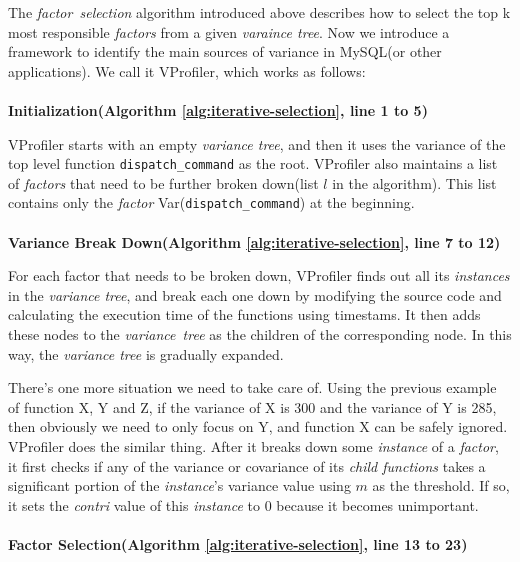 The \textit{factor\ selection} algorithm introduced above describes how to
select the top k most responsible \textit{factors} from a given
\textit{varaince tree}. Now we introduce a framework to identify the main
sources of variance in MySQL(or other applications). We call it VProfiler,
which works as follows:\\\\
\textbf{Initialization(Algorithm \ref{alg:iterative-selection}, line 1 to 5)}

VProfiler starts with an empty \textit{variance tree}, and then it uses the
variance of the top level function \texttt{dispatch\_command} as the root.
VProfiler also maintains a list of \textit{factors} that need to be further
broken down(list $l$ in the algorithm). This list contains only the
\textit{factor} Var(\texttt{dispatch\_command}) at the beginning.\\\\
\textbf{Variance Break Down(Algorithm \ref{alg:iterative-selection}, line 7 to
12)}

For each factor that needs to be broken down, VProfiler finds out all its
\textit{instances} in the \textit{variance tree}, and break each one down by
modifying the source code and calculating the execution time of the functions
using timestams. It then adds these nodes to the \textit{variance\ tree} as the
children of the corresponding node. In this way, the \textit{variance tree}
is gradually expanded.

There's one more situation we need to take care of. Using the previous example
of function X, Y and Z, if the variance of X is 300 and the variance of Y is
285, then obviously we need to only focus on Y, and function X can be safely
ignored. VProfiler does the similar thing. After it breaks down some
\textit{instance} of a \textit{factor}, it first checks if any of the variance
or covariance of its \textit{child functions} takes a significant portion of
the \textit{instance}'s variance value using $m$ as the threshold. If so, it
sets the \textit{contri} value of this \textit{instance} to 0 because it
becomes unimportant.\\\\
\textbf{Factor Selection(Algorithm \ref{alg:iterative-selection}, line 13 to
23)}

